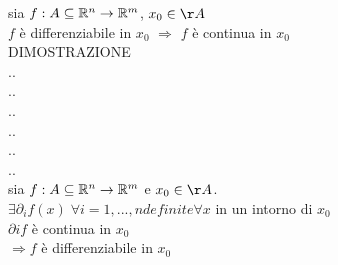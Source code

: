 \proposition
sia $f:A\subseteq \mathbb{R}^n\rightarrow \mathbb{R}^m$, $x_0\in\AA$\\
$f$ è differenziabile in $x_0$ $\Rightarrow$ $f$ è continua in $x_0$\\
DIMOSTRAZIONE\\

..\\
..\\
..\\
..\\
..\\
..\\


sia $f:A\subseteq \mathbb{R}^n\rightarrow \mathbb{R}^m$ e $x_0\in\AA$.\\
$\exists \partial_{i}f(x)\;\forall i=1,...,n definite \forall x$ in un intorno di $x_0$\\
$\partial{i}f$ è continua in $x_0$\\
$\Rightarrow f$ è differenziabile in $x_0$\\

